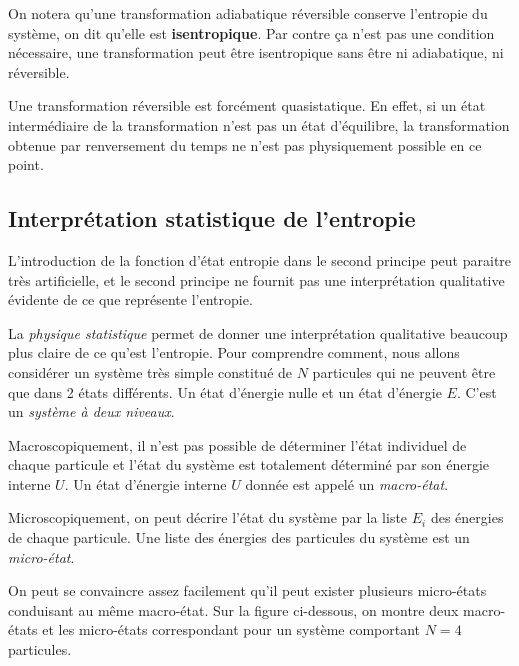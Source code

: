 \documentclass{cours}
\begin{document}
On notera qu'une transformation adiabatique réversible conserve l'entropie du système, on dit qu'elle est \textbf{isentropique}. Par contre ça n'est pas une condition nécessaire, une transformation peut être isentropique sans être ni adiabatique, ni réversible.

Une transformation réversible est forcément quasistatique. En effet, si un état intermédiaire de la transformation n'est pas un état d'équilibre, la transformation obtenue par renversement du temps ne n'est pas physiquement possible en ce point.

\subsection{Interprétation statistique de l'entropie}%
\label{sub:interpretation_statistique_de_l_entropie}
L'introduction de la fonction d'état entropie dans le second principe peut paraitre très artificielle, et le second principe ne fournit pas une interprétation qualitative évidente de ce que représente l'entropie.

La \textit{physique statistique} permet de donner une interprétation qualitative beaucoup plus claire de ce qu'est l'entropie. Pour comprendre comment, nous allons considérer un système très simple constitué de $N$ particules qui ne peuvent être que dans 2 états différents. Un état d'énergie nulle et un état d'énergie $E$. C'est un \textit{système à deux niveaux}. 

Macroscopiquement, il n'est pas possible de déterminer l'état individuel de chaque particule et l'état du système est totalement déterminé par son énergie interne $U$. Un état d'énergie interne $U$ donnée est appelé un \textit{macro-état}. 

Microscopiquement, on peut décrire l'état du système par la liste $E_i$ des énergies de chaque particule. Une liste des énergies des particules du système est un \textit{micro-état}.

On peut se convaincre assez facilement qu'il peut exister plusieurs micro-états conduisant au même macro-état. Sur la figure ci-dessous, on montre deux macro-états et les micro-états correspondant pour un système comportant $N=4$ particules.
\end{document}

